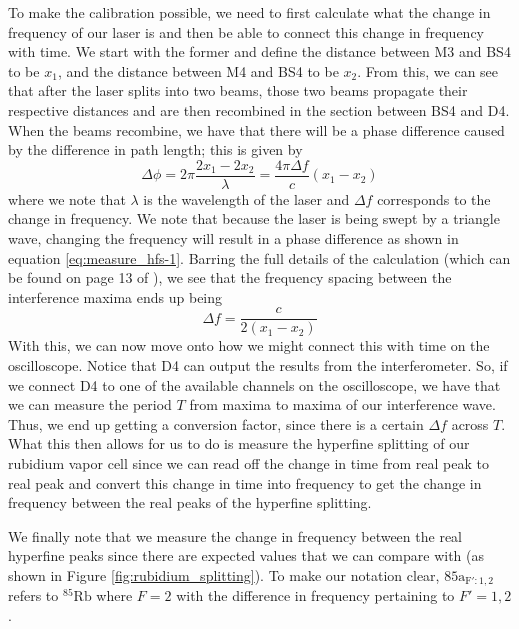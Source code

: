 \documentclass[twocolumn,amsmath,amssymb,pra, floatfix]{revtex4-2}
\begin{document}
To make the calibration possible, we need to first calculate what the change in frequency of our laser is and then be able to connect this change in frequency with time. We start with the former and define the distance between M3 and BS4 to be $x_{1}$, and the distance between M4 and BS4 to be $x_{2}$. From this, we can see that after the laser splits into two beams, those two beams propagate their respective distances and are then recombined in the section between BS4 and D4. When the beams recombine, we have that there will be a phase difference caused by the difference in path length; this is given by 
\begin{equation}
    \Delta \phi 
    =
    2 \pi \frac{2 x_{1} - 2 x_{2}}{\lambda} 
    =
    \frac{4 \pi \Delta f}{c} ( x_{1} - x_{2} )
    \label{eq:measure_hfs-1}
\end{equation}
where we note that $\lambda$ is the wavelength of the laser and $\Delta f$ corresponds to the change in frequency. We note that because the laser is being swept by a triangle wave, changing the frequency will result in a phase difference as shown in equation \ref{eq:measure_hfs-1}. Barring the full details of the calculation (which can be found on page 13 of \cite{gatech}), we see that the frequency spacing between the interference maxima ends up being 
\begin{equation}
    \Delta f = \frac{c}{2 (x_{1} - x_{2})}
    \label{eq:measure_hfs-2}
\end{equation}
With this, we can now move onto how we might connect this with time on the oscilloscope. Notice that D4 can output the results from the interferometer. So, if we connect D4 to one of the available channels on the oscilloscope, we have that we can measure the period $T$ from maxima to maxima of our interference wave. Thus, we end up getting a conversion factor, since there is a certain $\Delta f$ across $T$. What this then allows for us to do is measure the hyperfine splitting of our rubidium vapor cell since we can read off the change in time from real peak to real peak and convert this change in time into frequency to get the change in frequency between the real peaks of the hyperfine splitting.

We finally note that we measure the change in frequency between the real hyperfine peaks since there are expected values that we can compare with (as shown in Figure \ref{fig:rubidium_splitting}). To make our notation clear, $85\mathrm{a}_{\mathrm{F}': 1, 2}$ refers to ${}^{85} \mathrm{Rb}$ where $F = 2$ with the difference in frequency pertaining to $F' = 1, 2$.
\end{document}
